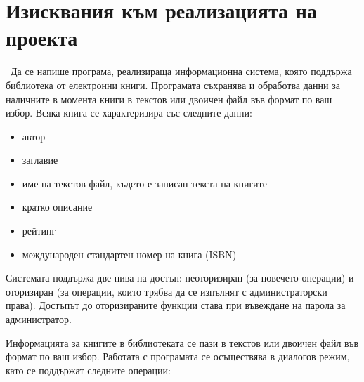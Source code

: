 \section{Изисквания към реализацията на проекта}\
Да се напише програма, реализираща информационна система, която поддържа библиотека от електронни книги. Програмата съхранява и обработва данни за наличните в момента книги в текстов или двоичен файл във формат по ваш избор. Всяка книга се характеризира със следните данни:
\begin{itemize}
    \item автор
    \item заглавие
    \item име на текстов файл, където е записан текста на книгите
    \item кратко описание
    \item рейтинг
    \item международен стандартен номер на книга (ISBN)
\end{itemize}
Системата поддържа две нива на достъп: неоторизиран (за повечето операции) и оторизиран (за операции, които трябва да се изпълнят с администраторски права). Достъпът до оторизираните функции става при въвеждане на парола за администратор.

Информацията за книгите в библиотеката се пази в текстов или двоичен файл във формат по ваш избор. Работата с програмата се осъществява в диалогов режим, като се поддържат следните операции:

